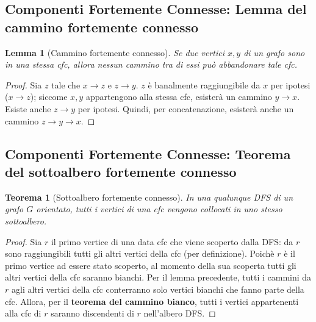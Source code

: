 \documentclass[11pt]{article}
\newtheorem*{theorem}{Teorema}
\newtheorem*{lemma}{Lemma}
\begin{document}
\subsection*{Componenti Fortemente Connesse: Lemma del cammino fortemente connesso}
\begin{lemma}[Cammino fortemente connesso]
    Se due vertici $x,y$ di un grafo sono in una stessa cfc, allora nessun cammino tra di essi può abbandonare tale cfc.
\end{lemma}
\begin{proof}
    Sia $z$ tale che $x\rightarrow z$ e $z\rightarrow y$. $z$ è banalmente raggiungibile da $x$ per ipotesi ($x\rightarrow z$); 
    siccome $x,y$ appartengono alla stessa cfc, esisterà un cammino $y\rightarrow x$. Esiste anche $z\rightarrow y$ per 
    ipotesi. Quindi, per concatenazione, esisterà anche un cammino $z\rightarrow y\rightarrow x$.
\end{proof}
\subsection*{Componenti Fortemente Connesse: Teorema del sottoalbero fortemente connesso}
\begin{theorem}[Sottoalbero fortemente connesso]
    In una qualunque DFS di un grafo $G$ orientato, tutti i vertici di una cfc vengono collocati in uno stesso sottoalbero.
\end{theorem}
\begin{proof}
    Sia $r$ il primo vertice di una data cfc che viene scoperto dalla DFS: da $r$ sono raggiungibili tutti gli altri vertici 
    della cfc (per definizione). Poichè $r$ è il primo vertice ad essere stato scoperto, al momento della sua scoperta tutti 
    gli altri vertici della cfc saranno bianchi. Per il lemma precedente, tutti i cammini da $r$ agli altri vertici della 
    cfc conterranno solo vertici bianchi che fanno parte della cfc. Allora, per il \textbf{teorema del cammino bianco}, 
    tutti i vertici appartenenti alla cfc di $r$ saranno discendenti di $r$ nell'albero DFS.
\end{proof}
\end{document}
